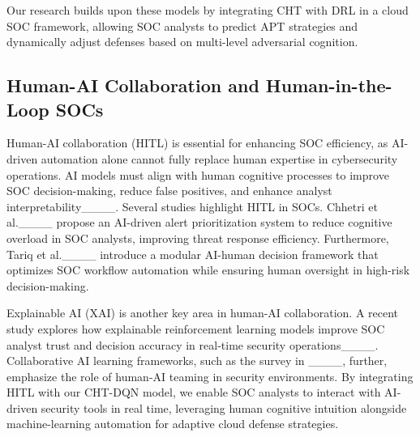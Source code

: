 Our research builds upon these models by integrating CHT with DRL in a cloud SOC framework, allowing SOC analysts to predict APT strategies and dynamically adjust defenses based on multi-level adversarial cognition.

\subsection{Human-AI Collaboration and Human-in-the-Loop SOCs}
Human-AI collaboration (HITL) is essential for enhancing SOC efficiency, as AI-driven automation alone cannot fully replace human expertise in cybersecurity operations. AI models must align with human cognitive processes to improve SOC decision-making, reduce false positives, and enhance analyst interpretability____.
Several studies highlight HITL in SOCs. Chhetri et al.____ propose an AI-driven alert prioritization system to reduce cognitive overload in SOC analysts, improving threat response efficiency. Furthermore, Tariq et al.____ introduce a modular AI-human decision framework that optimizes SOC workflow automation while ensuring human oversight in high-risk decision-making.

Explainable AI (XAI) is another key area in human-AI collaboration. A recent study explores how explainable reinforcement learning models improve SOC analyst trust and decision accuracy in real-time security operations____. Collaborative AI learning frameworks, such as the survey in ____, further, emphasize the role of human-AI teaming in security environments.
By integrating HITL with our CHT-DQN model, we enable SOC analysts to interact with AI-driven security tools in real time, leveraging human cognitive intuition alongside machine-learning automation for adaptive cloud defense strategies.
